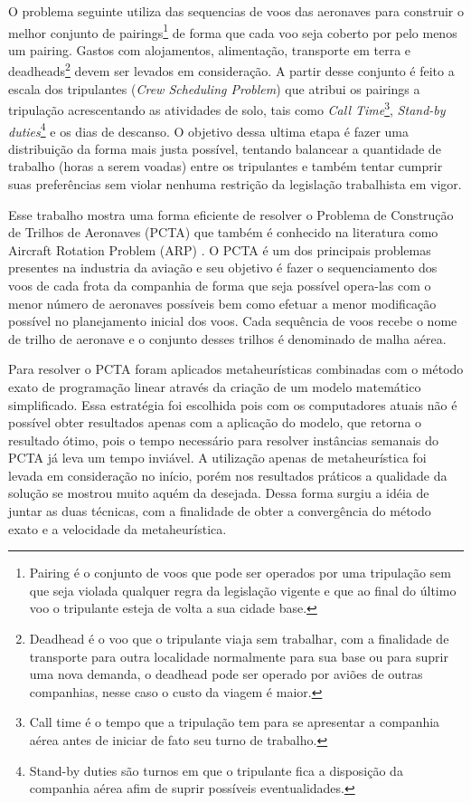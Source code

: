 O problema seguinte utiliza das sequencias de voos das aeronaves para construir
o melhor conjunto de pairings\footnote{Pairing é o conjunto de voos que pode
ser operados por uma tripulação sem que seja violada qualquer regra da
legislação vigente e que ao final do último voo o tripulante esteja de volta a
sua cidade base.} de forma que cada voo seja coberto por pelo menos um pairing.
Gastos com alojamentos, alimentação, transporte em terra e deadheads\footnote{Deadhead é o voo que o tripulante viaja sem trabalhar, com a finalidade de transporte para outra localidade normalmente para sua base ou para suprir uma nova demanda, o deadhead pode ser operado por
aviões de outras companhias, nesse caso o custo da viagem é maior.} devem
ser levados em consideração. A partir desse conjunto é feito a escala dos
tripulantes (\textit{Crew Scheduling Problem}) que atribui os pairings a
tripulação acrescentando as atividades de solo, tais como \textit{Call
Time}\footnote{Call time é o tempo que a tripulação tem para se apresentar a
companhia aérea antes de iniciar de fato seu turno de trabalho.},
\textit{Stand-by duties}\footnote{Stand-by duties
são turnos em que o tripulante fica a disposição da companhia aérea afim de
suprir possíveis eventualidades.} e os dias de descanso. O objetivo dessa ultima
etapa é fazer uma distribuição da forma mais justa possível, tentando balancear
a quantidade de trabalho (horas a serem voadas) entre os tripulantes e também
tentar cumprir suas preferências sem violar nenhuma restrição da
legislação trabalhista em vigor.
   

Esse trabalho mostra uma forma eficiente de resolver o Problema de Construção
de Trilhos de Aeronaves (PCTA) 
que também é conhecido na literatura como Aircraft Rotation
Problem (ARP) 
. O PCTA é um dos principais problemas presentes na industria da aviação e seu objetivo
é fazer o sequenciamento dos voos de cada frota da companhia de forma que seja
possível opera-las com o menor número de aeronaves possíveis \cite{abiliolivro}
bem como efetuar a menor modificação possível no planejamento inicial dos voos. Cada sequência de voos recebe o nome de trilho de aeronave e o conjunto desses
trilhos é denominado de malha aérea. 

Para resolver o PCTA foram aplicados metaheurísticas combinadas com
o método exato de programação linear através da criação de um modelo matemático
simplificado. Essa estratégia foi escolhida pois com os computadores atuais não
é possível obter resultados apenas com a aplicação do modelo, que retorna
o resultado ótimo, pois o tempo necessário para resolver instâncias semanais do
PCTA já leva um tempo inviável. A utilização apenas de metaheurística foi levada
em consideração no início, porém nos resultados práticos a qualidade da solução
se mostrou muito aquém da desejada. Dessa forma surgiu a idéia de juntar as
duas técnicas, com a finalidade de obter a convergência do método exato e a
velocidade da metaheurística.

